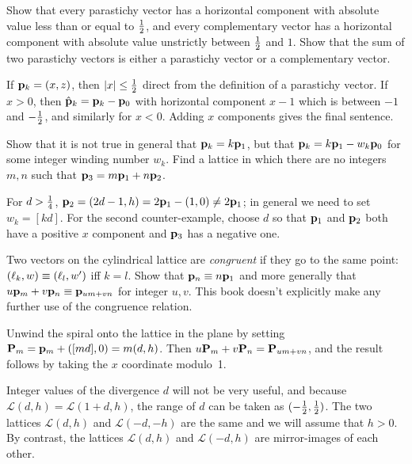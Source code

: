 \begin{jExercise}
	Show that every parastichy vector has a horizontal component with absolute value less than or equal to $\textstyle{\frac{1}{2}}$, and every complementary vector has a horizontal component with absolute value unstrictly between $\textstyle{\frac{1}{2}}$ and $1$. Show that the sum of two parastichy vectors is either a parastichy vector or a complementary vector. 
\end{jExercise}
\begin{jAnswer}
	If ${\mathbf p}_{k}=(x,z)$, then $|x|\leq\textstyle{\frac{1}{2}}$ direct from the definition of a parastichy vector.
	If $x>0$, then $\hat{\mathbf p}_{k}={\mathbf p}_{k}- {\mathbf p}_{0}$ with 
	horizontal component $x-1$ which is between $-1$ and $-\textstyle{\frac{1}{2}}$, and similarly for $x<0$. 
	Adding $x$ components gives the final sentence. 
\end{jAnswer}


\begin{jExercise}
	Show that it is not true in general that ${\mathbf p}_{k}=k{\mathbf p}_{1}$, but that ${\mathbf p}_{k}=k{\mathbf p}_{1}-w_k{\mathbf p}_{0}$ for some integer winding number $w_k$. Find a lattice in which there are no integers $m,n$ such that ${\mathbf p}_{3}=m{\mathbf p}_{1}+n{\mathbf p}_{2}$. 
\end{jExercise}
\begin{jAnswer}
	For $d>\textstyle{\frac{1}{4}}$, ${\mathbf p}_{2}= (2d-1, h)=2{\mathbf p}_{1}-(1,0)\neq 2{\mathbf p}_{1}$;   in general we need to set $w_k= [ kd]$. For the second counter-example, choose $d$ so that ${\mathbf p}_{1}$ and ${\mathbf p}_{2}$ both have a positive $x$ component and ${\mathbf p}_{3}$ has a negative one.  
\end{jAnswer}		
\begin{jExercise}
		Two vectors on the cylindrical lattice are \textit{congruent} if they go to the same point: $(\ell_{{k}},w)\equiv(\ell_{{l}},w')$ iff $k=l$. 
	Show that ${\mathbf p}_{n}\equiv n{\mathbf p}_{1}$ and more generally that $u{\mathbf p}_{m}+v{\mathbf p}_{n}\equiv{\mathbf p}_{um+vn}$ for integer  $u, v$.
	This book doesn't explicitly make any further use of the congruence relation. 
	\label{ex:npm}
\end{jExercise}
\begin{jAnswer}
	Unwind the spiral onto the lattice in the plane by setting ${\mathbf P}_{m}={\mathbf p}_{m}+([md],0)=m(d,h)$. Then $u{\mathbf P}_{m}+v{\mathbf P}_{n}={\mathbf P}_{um+vn}$, and the result follows by taking the $x$ coordinate modulo~1. 
		\end{jAnswer}
	
	
	
	Integer values of the divergence $d$ will not be very useful, and because   $\mathcal{L}(d,h)= \mathcal{L}(1+d,h)$, the range of $d$ can be taken as $(-\textstyle{\frac{1}{2}},\textstyle{\frac{1}{2}})$. The two lattices $\mathcal{L}(d,h)$ and $\mathcal{L}(-d,-h)$ are the same and we will assume that $h>0$. By contrast, the  lattices $\mathcal{L}(d,h)$ and $\mathcal{L}(-d,h)$ are mirror-images of each other.
		
